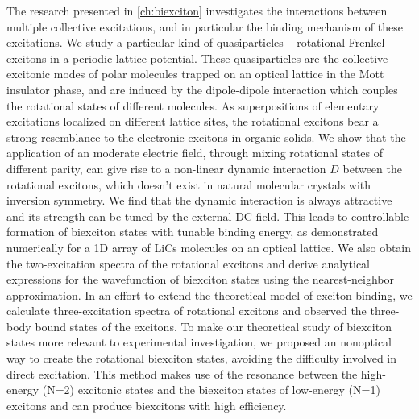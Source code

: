 The research presented in \autoref{ch:biexciton} investigates the interactions between multiple collective excitations, and
in particular the binding mechanism of these excitations. 
We study a particular kind of quasiparticles -- rotational Frenkel excitons in a 
periodic lattice potential. These quasiparticles are the collective excitonic modes of polar molecules 
trapped on an optical lattice in the Mott insulator phase, and are induced by the dipole-dipole interaction which couples the 
rotational states of different molecules. As superpositions of elementary excitations localized on different
 lattice sites, the rotational excitons  bear a strong resemblance to the electronic excitons in organic solids\cite{agranovich}.
We show that the application of an moderate electric field,  through mixing rotational states of different parity, can give 
rise to a non-linear dynamic interaction $D$ between the rotational excitons, which doesn't exist in 
natural molecular crystals with inversion symmetry. We find that the dynamic interaction is always attractive and its 
strength can be tuned by the external DC field. This leads to controllable formation of biexciton states with tunable binding
energy, as demonstrated numerically for a 1D array of LiCs molecules on an optical lattice. We also obtain the 
two-excitation spectra of the rotational excitons and derive analytical expressions for the wavefunction of biexciton states 
using the nearest-neighbor approximation. In an effort to extend the theoretical model of exciton binding, we calculate 
three-excitation spectra of rotational excitons and observed the three-body bound states of the excitons.
To make our theoretical study of biexciton states more relevant to experimental investigation, we proposed an nonoptical way to create the rotational biexciton states, avoiding the difficulty involved in 
direct excitation. This method makes use of the resonance between the high-energy (N=2) excitonic states 
and the biexciton states of low-energy (N=1) excitons and can produce biexcitons with high efficiency. 

